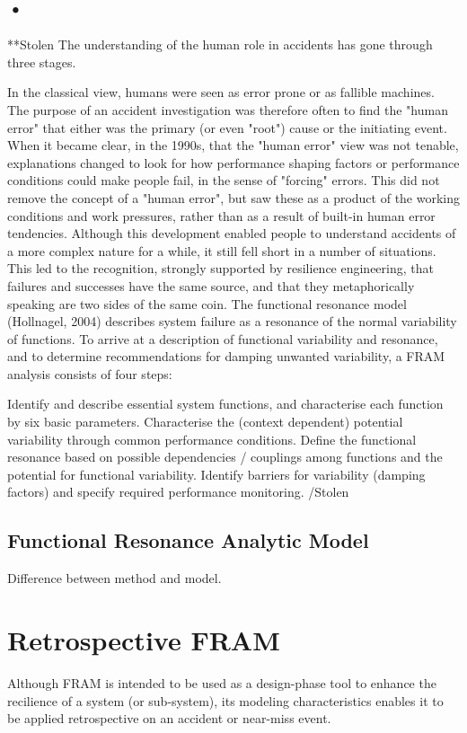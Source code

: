\subsection{•}
**Stolen
The understanding of the human role in accidents has gone through three stages. 

In the classical view, humans were seen as error prone or as fallible machines. The purpose of an accident investigation was therefore often to find the "human error" that either was the primary (or even "root") cause or the initiating event.
When it became clear, in the 1990s, that the "human error" view was not tenable, explanations changed to look for how performance shaping factors or performance conditions could make people fail, in the sense of "forcing" errors. This did not remove the concept of a "human error", but saw these as a product of the working conditions and work pressures, rather than as a result of built-in human error tendencies.
Although this development enabled people to understand accidents of a more complex nature for a while, it still fell short in a number of situations. This led to the recognition, strongly supported by resilience engineering, that failures and successes have the same source, and that they metaphorically speaking are two sides of the same coin.
The functional resonance model (Hollnagel, 2004) describes system failure as a resonance of the normal variability of functions. To arrive at a description of functional variability and resonance, and to determine recommendations for damping unwanted variability, a FRAM analysis consists of four steps:

Identify and describe essential system functions, and characterise each function by six basic parameters.
Characterise the (context dependent) potential variability through common performance conditions.
Define the functional resonance based on possible dependencies / couplings among functions and the potential for functional variability.
Identify barriers for variability (damping factors) and specify required performance monitoring.
/Stolen
\subsection{Functional Resonance Analytic Model}

Difference between method and model.


\section{Retrospective FRAM}
Although FRAM is intended to be used as a design-phase tool to enhance the recilience of a system (or sub-system), its modeling characteristics enables it to be applied retrospective on an accident or near-miss event.

